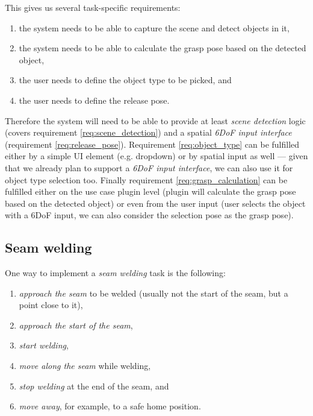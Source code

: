 This gives us several task-specific requirements:
\begin{enumerate}[label=(\roman*), itemsep=0.2em]
    \item the system needs to be able to capture the scene and detect objects in it, \label{req:scene_detection}
    \item the system needs to be able to calculate the grasp pose based on the detected object, \label{req:grasp_calculation}
    \item the user needs to define the object type to be picked, and \label{req:object_type}
    \item the user needs to define the release pose. \label{req:release_pose}
\end{enumerate}

Therefore the system will need to be able to provide at least \emph{scene detection} logic (covers requirement \ref{req:scene_detection}) and a spatial \emph{6DoF input interface} (requirement \ref{req:release_pose}). Requirement \ref{req:object_type} can be fulfilled either by a simple UI element (e.g. dropdown) or by spatial input as well --- given that we already plan to support a \emph{6DoF input interface}, we can also use it for object type selection too. Finally requirement \ref{req:grasp_calculation} can be fulfilled either on the use case plugin level (plugin will calculate the grasp pose based on the detected object) or even from the user input (user selects the object with a 6DoF input, we can also consider the selection pose as the grasp pose).

\subsection{Seam welding} \label{subsec:ch2_analysis_seam_welding}

One way to implement a \emph{seam welding} task is the following:
\begin{enumerate}[label=(\arabic*), itemsep=0.2em]
    \item \emph{approach the seam} to be welded (usually not the start of the seam, but a point close to it),
    \item \emph{approach the start of the seam},
    \item \emph{start welding},
    \item \emph{move along the seam} while welding,
    \item \emph{stop welding} at the end of the seam, and
    \item \emph{move away}, for example, to a safe home position.
\end{enumerate}


